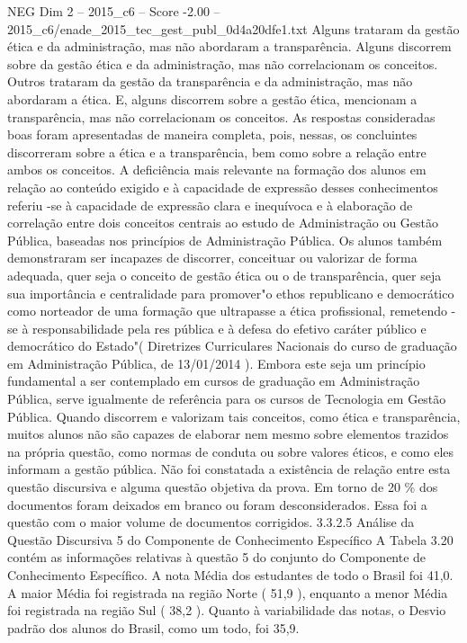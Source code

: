 \begin{textsample}{NEG Dim 2 – 2015\_c6 – Score -2.00 – 2015\_c6/enade\_2015\_tec\_gest\_publ\_0d4a20dfe1.txt}
Alguns trataram da gestão ética e da administração, mas não abordaram a transparência.
Alguns discorrem sobre da gestão ética e da administração, mas não correlacionam os conceitos.
Outros trataram da gestão da transparência e da administração, mas não abordaram a ética.
E, alguns discorrem sobre a gestão ética, mencionam a transparência, mas não correlacionam os conceitos.
As respostas consideradas boas foram apresentadas de maneira completa, pois, nessas, os concluintes discorreram sobre a ética e a transparência, bem como sobre a relação entre ambos os conceitos.
A deficiência mais relevante na formação dos alunos em relação ao conteúdo exigido e à capacidade de expressão desses conhecimentos referiu -se à capacidade de expressão clara e inequívoca e à elaboração de correlação entre dois conceitos centrais ao estudo de Administração ou Gestão Pública, baseadas nos princípios de Administração Pública.
Os alunos também demonstraram ser incapazes de discorrer, conceituar ou valorizar de forma adequada, quer seja o conceito de gestão ética ou o de transparência, quer seja sua importância e centralidade para promover"o ethos republicano e democrático como norteador de uma formação que ultrapasse a ética profissional, remetendo -se à responsabilidade pela res pública e à defesa do efetivo caráter público e democrático do Estado"( Diretrizes Curriculares Nacionais do curso de graduação em Administração Pública, de 13/01/2014 ).
Embora este seja um princípio fundamental a ser contemplado em cursos de graduação em Administração Pública, serve igualmente de referência para os cursos de Tecnologia em Gestão Pública.
Quando discorrem e valorizam tais conceitos, como ética e transparência, muitos alunos não são capazes de elaborar nem mesmo sobre elementos trazidos na própria questão, como normas de conduta ou sobre valores éticos, e como eles informam a gestão pública.
Não foi constatada a existência de relação entre esta questão discursiva e alguma questão objetiva da prova.
Em torno de 20 \% dos documentos foram deixados em branco ou foram desconsiderados.
Essa foi a questão com o maior volume de documentos corrigidos. 3.3.2.5 Análise da Questão Discursiva 5 do Componente de Conhecimento Específico A Tabela 3.20 contém as informações relativas à questão 5 do conjunto do Componente de Conhecimento Específico.
A nota Média dos estudantes de todo o Brasil foi 41,0.
A maior Média foi registrada na região Norte ( 51,9 ), enquanto a menor Média foi registrada na região Sul ( 38,2 ).
Quanto à variabilidade das notas, o Desvio padrão dos alunos do Brasil, como um todo, foi 35,9.

\end{textsample}
